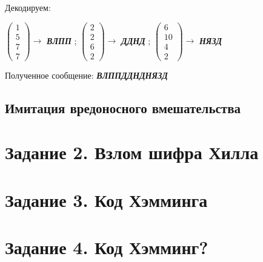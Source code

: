 \documentclass[a5paper, 10pt]{article}
\theoremstyle{definition}
\theoremstyle{plain}
\theoremstyle{remark}
\begin{document}
Декодируем:
\begin{center}
 $ \begin{pmatrix}
 1\\
5\\
7\\
7
\end{pmatrix} \to$ \textbf{\textit{ВЛПП}} ;
 $ \begin{pmatrix}
 2\\
2 \\
6\\
2
\end{pmatrix} \to$ \textbf{\textit{ДДНД}} ;
 $ \begin{pmatrix}
 6\\
10\\
4\\
2
\end{pmatrix} \to$ \textbf{\textit{НЯЗД}} 
 \\

\end{center}
Полученное сообщение:  \textbf{\textit{ВЛППДДНДНЯЗД}}

\subsection{Имитация вредоносного вмешательства}



\section{Задание 2. Взлом шифра Хилла}	

\section{Задание 3. Код Хэмминга}

\section{Задание 4. Код Хэмминг?}
\end{document}
